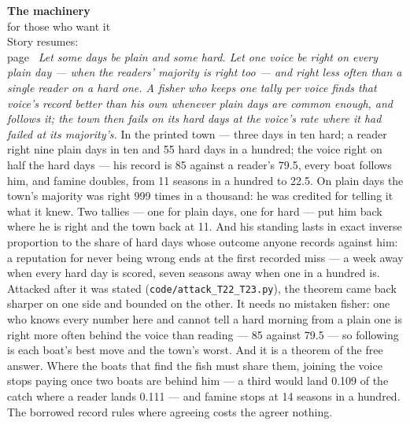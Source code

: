 \begin{machinery}{\textbf{The machinery}\\for those who want it\\[3pt]{\color{muted}Story resumes:\\page~\pageref{ch12}}}
\noindent \emph{Let some days be plain
and some hard. Let one voice be right on every plain day --- when the
readers' majority is right too --- and right less often than a single
reader on a hard one. A fisher who keeps one tally per voice finds
that voice's record better than his own whenever plain days are common
enough, and follows it; the town then fails on its hard days at the
voice's rate where it had failed at its majority's.} In the printed
town --- three days in ten hard; a reader right nine plain days in ten
and 55 hard days in a hundred; the voice right on half the hard days ---
his record is 85 against a reader's 79.5, every boat follows him, and
famine doubles, from 11 seasons in a hundred to 22.5. On plain days
the town's majority was right 999 times in a thousand: he was credited
for telling it what it knew. Two tallies --- one for plain days, one for
hard --- put him back where he is right and the town back at 11. And his
standing lasts in exact inverse proportion to the share of hard days
whose outcome anyone records against him: a reputation for never
being wrong ends at the first recorded miss --- a week away when every
hard day is scored, seven seasons away when one in a hundred is.
Attacked after it was stated (\texttt{code/\allowbreak{}attack\_\allowbreak{}T22\_\allowbreak{}T23.\allowbreak{}py}), the theorem
came back sharper on one side and bounded on the other. It needs no
mistaken fisher: one who knows every number here and cannot tell a
hard morning from a plain one is right more often behind the voice
than reading --- 85 against 79.5 --- so following is each boat's best move
and the town's worst. And it is a theorem of the free answer. Where
the boats that find the fish must share them, joining the voice stops
paying once two boats are behind him --- a third would land 0.109 of the
catch where a reader lands 0.111 --- and famine stops at 14 seasons in a
hundred. The borrowed record rules where agreeing costs the agreer
nothing.


\label{claim-27}


\end{machinery}
